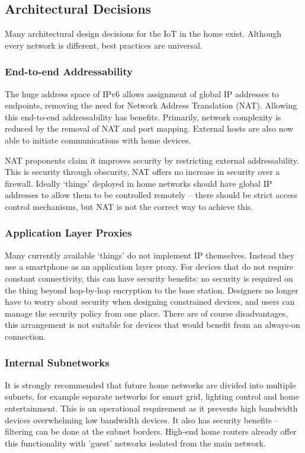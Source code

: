 \documentclass[10pt,journal,compsoc]{IEEEtran}
\begin{document}
\subsection{Architectural Decisions}
Many architectural design decisions for the IoT in the home exist. Although
every network is different, best practices are universal. 

\subsubsection{End-to-end Addressability}
The huge address space of IPv6 allows assignment of global IP addresses to
endpoints, removing the need for Network Address Translation (NAT). Allowing
this end-to-end addressability has benefits. Primarily, network complexity is
reduced by the removal of NAT and port mapping. External hosts are also now
able to initiate communications with home devices.

NAT proponents claim it improves security by restricting external
addressability. This is security through obscurity, NAT offers no increase in
security over a firewall. Ideally `things' deployed in home networks should
have global IP addresses to allow them to be controlled remotely -- there
should be strict access control mechanisms, but NAT is not the correct way to
achieve this. 

\subsubsection{Application Layer Proxies}
Many currently available `things' do not implement IP themselves. Instead they
use a smartphone as an application layer proxy. For devices that do not require
constant connectivity, this can have security benefits: no security is required
on the thing beyond hop-by-hop encryption to the base station.  Designers no
longer have to worry about security when designing constrained devices, and
users can manage the security policy from one place. There are of course
disadvantages, this arrangement is not suitable for devices that would benefit
from an always-on connection. 

\subsubsection{Internal Subnetworks}
It is strongly recommended that future home networks are divided into multiple
subnets, for example separate networks for smart grid, lighting control and
home entertainment. This is an operational requirement as it prevents high
bandwidth devices overwhelming low bandwidth devices. It also has security
benefits -- filtering can be done at the subnet borders. High-end home routers
already offer this functionality with 'guest' networks isolated from the main
network.
\end{document}
